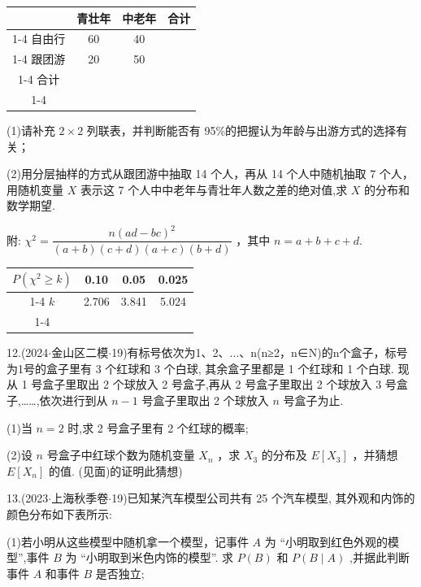 \begin{center}

\begin{tabular}{|c|c|c|c|}
\hline
\phantom{X} & 青壮年 & 中老年 & 合计 \\
\cline{1-4}
自由行 & 60 & 40 & \phantom{X} \\
\cline{1-4}
跟团游 & 20 & 50 & \phantom{X} \\
\cline{1-4}
合计 & \phantom{X} & \phantom{X} & \phantom{X} \\
\cline{1-4}
\hline
\end{tabular}
\end{center}

(1)请补充 $2 \times  2$ 列联表，并判断能否有 95\%的把握认为年龄与出游方式的选择有关；

(2)用分层抽样的方式从跟团游中抽取 14 个人，再从 14 个人中随机抽取 7 个人，用随机变量 $X$ 表示这 7 个人中中老年与青壮年人数之差的绝对值,求 $X$ 的分布和数学期望.

附: ${\chi }^{2} = \dfrac{n{\left( ad - bc\right) }^{2}}{\left( {a + b}\right) \left( {c + d}\right) \left( {a + c}\right) \left( {b + d}\right) }$ ，其中 $n = a + b + c + d$.

\begin{center}

\begin{tabular}{|c|c|c|c|}
\hline
$P\left( {{\chi }^{2} \geq  k}\right)$ & 0.10 & 0.05 & 0.025 \\
\cline{1-4}
$k$ & 2.706 & 3.841 & 5.024 \\
\cline{1-4}
\hline
\end{tabular}
\end{center}

12.(2024$\cdot$金山区二模$\cdot$19)有标号依次为1、2、...、n(n≥2，n∈N)的n个盒子，标号为1号的盒子里有 3 个红球和 3 个白球, 其余盒子里都是 1 个红球和 1 个白球. 现从 1 号盒子里取出 2 个球放入 2 号盒子,再从 2 号盒子里取出 2 个球放入 3 号盒子,……,依次进行到从 $n - 1$ 号盒子里取出 2 个球放入 $n$ 号盒子为止.

(1)当 $n = 2$ 时,求 2 号盒子里有 2 个红球的概率;

(2)设 $n$ 号盒子中红球个数为随机变量 ${X}_{n}$ ，求 ${X}_{3}$ 的分布及 $E\left\lbrack  {X}_{3}\right\rbrack$ ，并猜想 $E\left\lbrack  {X}_{n}\right\rbrack$ 的值. (见面)的证明此猜想)

13.(2023$\cdot$上海秋季卷$\cdot$19)已知某汽车模型公司共有 25 个汽车模型, 其外观和内饰的颜色分布如下表所示:

(1)若小明从这些模型中随机拿一个模型，记事件 $A$ 为 “小明取到红色外观的模型”,事件 $B$ 为 “小明取到米色内饰的模型”. 求 $P\left( B\right)$ 和 $P\left( {B \mid  A}\right)$ ,并据此判断事件 $A$ 和事件 $B$ 是否独立;


